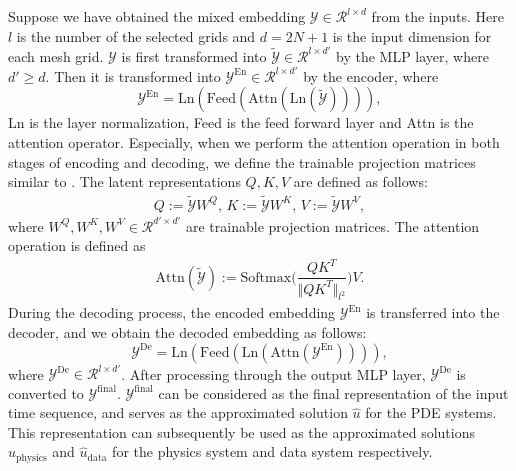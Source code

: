 \documentclass[preprint,11pt]{elsarticle}
\begin{document}
Suppose we have obtained the mixed embedding $\mathcal{Y} \in \mathcal{R}^{l \times d}$ from the inputs. Here $l$ is the number of the selected grids and $d=2N+1$ is the input dimension for each mesh grid. $\mathcal{Y}$ is first transformed into $\tilde{\mathcal{Y}} \in \mathcal{R}^{l \times d'}$ by the MLP layer, where $d' \geq d$. Then it is transformed into $\mathcal{Y}^{\text{En}}\in \mathcal{R}^{l \times d'}$ by the encoder, where 
\begin{equation} \label{encoder}
    \mathcal{Y}^{\text{En}} = \text{Ln}(\text{Feed}(\text{Attn}(\text{Ln}(\tilde{\mathcal{Y}})))),
\end{equation}
Ln is the layer normalization, Feed is the feed forward layer and Attn is the attention operator. Especially, when we perform the attention operation in both stages of encoding and decoding, we define the trainable projection matrices similar to \cite{cao2021choose}. The latent representations $Q,K,V$ are defined as follows:
\begin{align}
    Q:= \tilde{\mathcal{Y}}W^{Q},\, K:= \tilde{\mathcal{Y}}W^{K},\, V:= \tilde{\mathcal{Y}}W^{V},
\end{align}
where $W^{Q}, W^{K}, W^{V} \in \mathcal{R}^{d' \times d'}$ are trainable projection matrices. The attention operation is defined as
\begin{align}
    \mathrm{Attn}(\tilde{\mathcal{Y}}) := \mathrm{Softmax}\bigg(\dfrac{QK^T}{\Vert QK^T\Vert_{l^2}}\bigg)V.
\end{align}
During the decoding process, the encoded embedding $\mathcal{Y}^{\text{En}}$ is transferred into the decoder, and we obtain the decoded embedding as follows:
\begin{equation} \label{decoder}
    \mathcal{Y}^{\text{De}} = \text{Ln}(\text{Feed}(\text{Ln}(\text{Attn}(\mathcal{Y}^{\text{En}})))),
\end{equation}
where $\mathcal{Y}^{\text{De}} \in \mathcal{R}^{l \times d'}$. After processing through the output MLP layer, $\mathcal{Y}^{\text{De}}$ is converted to $\mathcal{Y}^\text{final}$. $\mathcal{Y}^\text{final}$ can be considered as the final representation of the input time sequence, and serves as the approximated solution $\hat{u}$ for the PDE systems. This representation can subsequently be used as the approximated solutions $\hat{u}_{\text{physics}}$ and $\hat{u}_{\text{data}}$ for the physics system and data system respectively.
\end{document}
